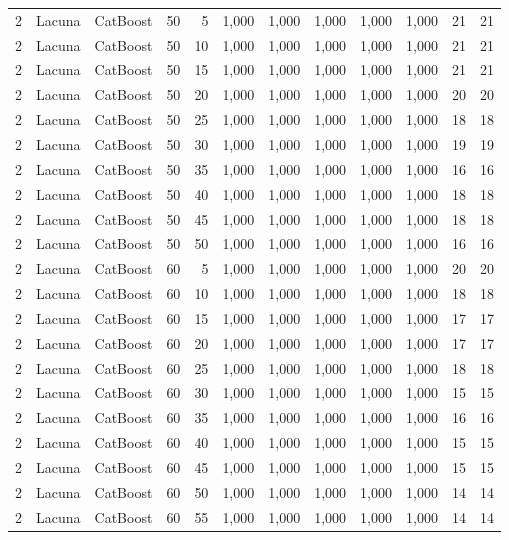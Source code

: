 \begin{longtable}{ccclrrrrrrrr}
2 & Lacuna & CatBoost & 50 & 5 & 1,000 & 1,000 & 1,000 & 1,000 & 1,000 & 21 & 21 \\
2 & Lacuna & CatBoost & 50 & 10 & 1,000 & 1,000 & 1,000 & 1,000 & 1,000 & 21 & 21 \\
2 & Lacuna & CatBoost & 50 & 15 & 1,000 & 1,000 & 1,000 & 1,000 & 1,000 & 21 & 21 \\
2 & Lacuna & CatBoost & 50 & 20 & 1,000 & 1,000 & 1,000 & 1,000 & 1,000 & 20 & 20 \\
2 & Lacuna & CatBoost & 50 & 25 & 1,000 & 1,000 & 1,000 & 1,000 & 1,000 & 18 & 18 \\
2 & Lacuna & CatBoost & 50 & 30 & 1,000 & 1,000 & 1,000 & 1,000 & 1,000 & 19 & 19 \\
2 & Lacuna & CatBoost & 50 & 35 & 1,000 & 1,000 & 1,000 & 1,000 & 1,000 & 16 & 16 \\
2 & Lacuna & CatBoost & 50 & 40 & 1,000 & 1,000 & 1,000 & 1,000 & 1,000 & 18 & 18 \\
2 & Lacuna & CatBoost & 50 & 45 & 1,000 & 1,000 & 1,000 & 1,000 & 1,000 & 18 & 18 \\
2 & Lacuna & CatBoost & 50 & 50 & 1,000 & 1,000 & 1,000 & 1,000 & 1,000 & 16 & 16 \\
2 & Lacuna & CatBoost & 60 & 5 & 1,000 & 1,000 & 1,000 & 1,000 & 1,000 & 20 & 20 \\
2 & Lacuna & CatBoost & 60 & 10 & 1,000 & 1,000 & 1,000 & 1,000 & 1,000 & 18 & 18 \\
2 & Lacuna & CatBoost & 60 & 15 & 1,000 & 1,000 & 1,000 & 1,000 & 1,000 & 17 & 17 \\
2 & Lacuna & CatBoost & 60 & 20 & 1,000 & 1,000 & 1,000 & 1,000 & 1,000 & 17 & 17 \\
2 & Lacuna & CatBoost & 60 & 25 & 1,000 & 1,000 & 1,000 & 1,000 & 1,000 & 18 & 18 \\
2 & Lacuna & CatBoost & 60 & 30 & 1,000 & 1,000 & 1,000 & 1,000 & 1,000 & 15 & 15 \\
2 & Lacuna & CatBoost & 60 & 35 & 1,000 & 1,000 & 1,000 & 1,000 & 1,000 & 16 & 16 \\
2 & Lacuna & CatBoost & 60 & 40 & 1,000 & 1,000 & 1,000 & 1,000 & 1,000 & 15 & 15 \\
2 & Lacuna & CatBoost & 60 & 45 & 1,000 & 1,000 & 1,000 & 1,000 & 1,000 & 15 & 15 \\
2 & Lacuna & CatBoost & 60 & 50 & 1,000 & 1,000 & 1,000 & 1,000 & 1,000 & 14 & 14 \\
2 & Lacuna & CatBoost & 60 & 55 & 1,000 & 1,000 & 1,000 & 1,000 & 1,000 & 14 & 14 \\

\end{longtable}
